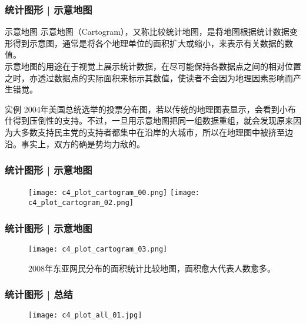 \begin{frame}
  \frametitle{统计图形 | 示意地图}
  \begin{block}{示意地图}
示意地图（Cartogram），又称比较统计地图，是将地图根据统计数据变形得到示意图，通常是将各个地理单位的面积扩大或缩小，来表示有关数据的数值。\\
\vspace{0.5em}
示意地图的用途在于视觉上展示统计数据，在尽可能保持各数据点之间的相对位置之时，亦透过数据点的实际面积来标示其数值，使读者不会因为地理因素影响而产生错觉。
  \end{block}
  \pause
  \begin{block}{实例}
2004年美国总统选举的投票分布图，若以传统的地理图表显示，会看到小布什得到压倒性的支持。不过，一旦用示意地图把同一组数据重组，就会发现原来因为大多数支持民主党的支持者都集中在沿岸的大城市，所以在地理图中被挤至边沿。事实上，双方的确是势均力敌的。
  \end{block}
\end{frame}

\begin{frame}
  \frametitle{统计图形 | 示意地图}
  \begin{figure}
    \centering
    \texttt{[image: c4\_plot\_cartogram\_00.png]}
    \texttt{[image: c4\_plot\_cartogram\_02.png]}
  \end{figure}
\end{frame}

\begin{frame}
  \frametitle{统计图形 | 示意地图}
  \begin{figure}
    \centering
    \texttt{[image: c4\_plot\_cartogram\_03.png]}
    \caption{2008年东亚网民分布的面积统计比较地图，面积愈大代表人数愈多。}
  \end{figure}
\end{frame}

\begin{frame}
  \frametitle{统计图形 | 总结}
  \begin{figure}
    \centering
    \texttt{[image: c4\_plot\_all\_01.jpg]}
  \end{figure}
\end{frame}

